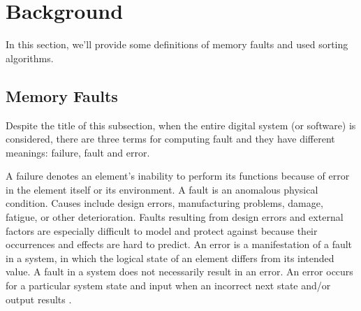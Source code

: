 \section{Background}

In this section, we'll provide some definitions of memory faults and used sorting algorithms.

\subsection{Memory Faults}

Despite the title of this subsection, when the entire digital system (or software) is considered, there are three terms for computing fault and they have different meanings: failure, fault and error. 

A failure denotes an element's inability to perform its functions because of error in the element itself or its environment. A fault is an anomalous physical condition. Causes include design errors, manufacturing problems, damage, fatigue, or other deterioration. Faults resulting from design errors and external factors are especially difficult to model and protect against because their occurrences and effects are hard to predict. An error is a manifestation of a fault in a system, in which the logical state of an element differs from its intended value. A fault in a system does not necessarily result in an error. An error occurs for a particular system state and input when an incorrect next state and/or output results \cite{Nelson1990}.